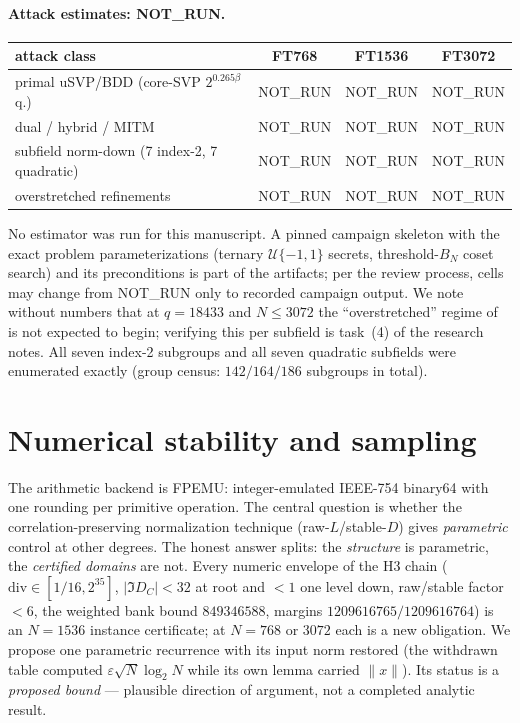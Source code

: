 \documentclass[11pt,a4paper]{article}
\theoremstyle{remark}
\newcommand{\NOTRUN}{\textsf{NOT\_RUN}}
\begin{document}
\paragraph{Attack estimates: \NOTRUN.}
\begin{center}
\begin{tabular}{lccc}
\toprule
attack class & FT768 & FT1536 & FT3072 \\
\midrule
primal uSVP/BDD (core-SVP $2^{0.265\beta}$ q.) & \NOTRUN & \NOTRUN & \NOTRUN \\
dual / hybrid / MITM & \NOTRUN & \NOTRUN & \NOTRUN \\
subfield norm-down (7 index-2, 7 quadratic) & \NOTRUN & \NOTRUN & \NOTRUN \\
overstretched refinements & \NOTRUN & \NOTRUN & \NOTRUN \\
\bottomrule
\end{tabular}
\end{center}
No estimator was run for this manuscript. A pinned campaign skeleton with
the exact problem parameterizations (ternary $\mathcal U\{-1,1\}$ secrets,
threshold-$B_N$ coset search) and its preconditions is part of the
artifacts; per the review process, cells may change from \NOTRUN{} only to
recorded campaign output. We note without numbers that at $q=18433$ and
$N\le 3072$ the ``overstretched'' regime of~\cite{abd16,kirfou17,ducwoe21}
is not expected to begin; verifying this per subfield is task~(4) of the
research notes. All seven index-2 subgroups and all seven quadratic subfields
were enumerated exactly (group census: $142/164/186$ subgroups in total).

\section{Numerical stability and sampling}
\label{sec:stability}

The arithmetic backend is FPEMU: integer-emulated IEEE-754 binary64 with one
rounding per primitive operation. The central question is whether the
correlation-preserving normalization technique (raw-$L$/stable-$D$) gives
\emph{parametric} control at other degrees. The honest answer splits:
the \emph{structure} is parametric, the \emph{certified domains} are not.
Every numeric envelope of the H3 chain ($\mathrm{div}\in[1/16,2^{35}]$,
$|\Im D_C|<32$ at root and $<1$ one level down, raw/stable factor $<6$, the
weighted bank bound $849346588$, margins $1209616765/1209616764$) is an
$N=1536$ instance certificate; at $N=768$ or $3072$ each is a new
obligation. We propose one parametric recurrence with its input norm
restored (the withdrawn table computed $\varepsilon\sqrt N\log_2 N$ while
its own lemma carried $\|x\|$). Its status is a \emph{proposed bound} ---
plausible direction of argument, not a completed analytic result.
\end{document}
